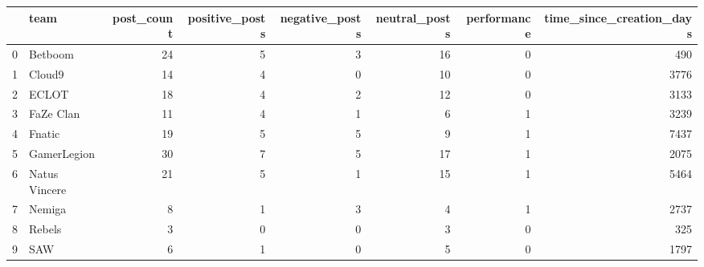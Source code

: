 \begin{tabular}{llrrrrrr}
\toprule
 & team & post_count & positive_posts & negative_posts & neutral_posts & performance & time_since_creation_days \\
\midrule
0 & Betboom & 24 & 5 & 3 & 16 & 0 & 490 \\
1 & Cloud9 & 14 & 4 & 0 & 10 & 0 & 3776 \\
2 & ECLOT & 18 & 4 & 2 & 12 & 0 & 3133 \\
3 & FaZe Clan & 11 & 4 & 1 & 6 & 1 & 3239 \\
4 & Fnatic & 19 & 5 & 5 & 9 & 1 & 7437 \\
5 & GamerLegion & 30 & 7 & 5 & 17 & 1 & 2075 \\
6 & Natus Vincere & 21 & 5 & 1 & 15 & 1 & 5464 \\
7 & Nemiga & 8 & 1 & 3 & 4 & 1 & 2737 \\
8 & Rebels & 3 & 0 & 0 & 3 & 0 & 325 \\
9 & SAW & 6 & 1 & 0 & 5 & 0 & 1797 \\
\bottomrule
\end{tabular}
